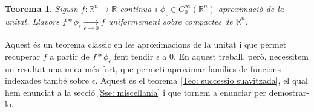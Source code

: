 \documentclass{article}
\numberwithin{equation}{section}
\newtheorem{teorema}{Teorema}[section]
\begin{document}
\begin{teorema}
Siguin $f:\mathbb{R}^n\rightarrow\mathbb{R}$ cont\'{i}nua i $\phi_{\epsilon}\in C_0^{\infty}(\mathbb{R}^n)$ aproximaci\'{o} de la unitat. Llavors $f*\phi_{\epsilon}\xrightarrow[\epsilon\to0]{}f$ uniformement sobre compactes de $\mathbb{R}^n$.
\end{teorema}

Aquest \'{e}s un teorema cl\`{a}ssic en les aproximacions de la unitat i que permet recuperar $f$ a partir de $f*\phi_{\epsilon}$ fent tendir $\epsilon$ a 0. En aquest treball, per\`{o}, necessitem un resultat una mica m\'{e}s fort, que permeti aproximar fam\'{i}lies de funcions indexades tamb\'{e} sobre $\epsilon$. Aquest \'{e}s el teorema \ref{Teo: successio suavitzada}, el qual hem enunciat a la secci\'{o} \ref{Sse: miscellania} i que tornem a enunciar per demostrar-lo.
\end{document}

